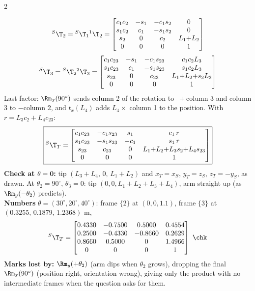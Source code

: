 \begin{multicols}{2}
\begin{examq}
\[{}^S\T_2={}^S\T_1{}^1\T_2=\begin{bmatrix}c_1c_2&-s_1&-c_1s_2&0\\s_1c_2&c_1&-s_1s_2&0\\s_2&0&c_2&L_1{+}L_2\\0&0&0&1\end{bmatrix}\]
\[{}^S\T_3={}^S\T_2{}^2\T_3=\begin{bmatrix}c_1c_{23}&-s_1&-c_1s_{23}&c_1c_2L_3\\s_1c_{23}&c_1&-s_1s_{23}&s_1c_2L_3\\s_{23}&0&c_{23}&L_1{+}L_2{+}s_2L_3\\0&0&0&1\end{bmatrix}\]
Last factor: $\Rm_x(90^\circ)$ sends column 2 of the rotation to $\ +$column 3 and column 3 to $-$column 2, and $t_x(L_4)$ adds $L_4\times$ column 1 to the position. With $r=L_3c_2+L_4c_{23}$:
\[\boxed{{}^S\T_T=\begin{bmatrix}c_1c_{23}&-c_1s_{23}&s_1&c_1\,r\\s_1c_{23}&-s_1s_{23}&-c_1&s_1\,r\\s_{23}&c_{23}&0&L_1{+}L_2{+}L_3s_2{+}L_4s_{23}\\0&0&0&1\end{bmatrix}}\]
\textbf{Check at $\theta=\mathbf 0$:} tip $(L_3{+}L_4,\,0,\,L_1{+}L_2)$ and $x_T=x_S$, $y_T=z_S$, $z_T=-y_S$, as drawn. At $\theta_2=90^\circ$, $\theta_3=0$: tip $(0,0,L_1{+}L_2{+}L_3{+}L_4)$, arm straight up (as $\Rm_y(-\theta_2)$ predicts).\\
\textbf{Numbers} $\theta=(30^\circ,20^\circ,40^\circ)$: frame $\{2\}$ at $(0,0,1.1)$, frame $\{3\}$ at $(0.3255,\,0.1879,\,1.2368)$ m,
\[{}^S\T_T=\begin{bmatrix}0.4330&-0.7500&0.5000&0.4554\\0.2500&-0.4330&-0.8660&0.2629\\0.8660&0.5000&0&1.4966\\0&0&0&1\end{bmatrix}\ \chk\]
\textbf{Marks lost by:} $\Rm_y(+\theta_2)$ (arm dips when $\theta_2$ grows), dropping the final $\Rm_x(90^\circ)$ (position right, orientation wrong), giving only the product with no intermediate frames when the question asks for them.
\end{examq}


\end{multicols}
